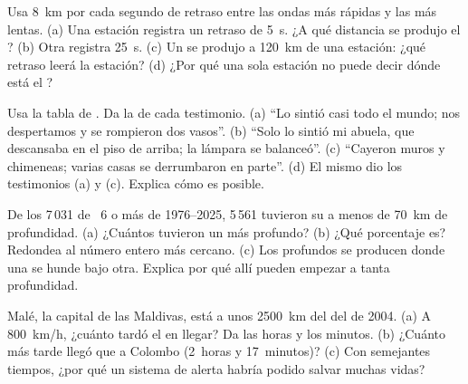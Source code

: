 \begin{exercise}[$\star\star$]\label{exo:g7:earthquakes:7}
Usa \qty{8}{km} por cada segundo de retraso entre las ondas más rápidas y
las más lentas. (a) Una estación registra un retraso de \qty{5}{s}. ¿A qué
distancia se produjo el ? (b) Otra registra \qty{25}{s}. (c) Un
 se produjo a \qty{120}{km} de una estación: ¿qué retraso leerá
la estación? (d) ¿Por qué una sola estación no puede decir dónde está el
?
\end{exercise}

\begin{exercise}[$\star\star$]\label{exo:g7:earthquakes:8}
Usa la tabla de . Da la  de cada testimonio.
(a) ``Lo sintió casi todo el mundo; nos despertamos y se rompieron dos
vasos''. (b) ``Solo lo sintió mi abuela, que descansaba en el piso de
arriba; la lámpara se balanceó''. (c) ``Cayeron muros y chimeneas; varias
casas se derrumbaron en parte''. (d) El mismo  dio los testimonios
(a) y (c). Explica cómo es posible.
\end{exercise}

\begin{exercise}[$\star\star$]\label{exo:g7:earthquakes:9}
De los 7\,031  de ~6 o más de 1976--2025, 5\,561 tuvieron
su  a menos de \qty{70}{km} de profundidad. (a) ¿Cuántos tuvieron
un  más profundo? (b) ¿Qué porcentaje es? Redondea al número
entero más cercano. (c) Los profundos se producen donde una  se hunde
bajo otra. Explica por qué allí pueden empezar a tanta profundidad.
\end{exercise}

\begin{exercise}[$\star\star$]\label{exo:g7:earthquakes:10}
Malé, la capital de las Maldivas, está a unos \qty{2500}{km} del
 del  de 2004. (a) A \qty{800}{km/h}, ¿cuánto tardó el
 en llegar? Da las horas y los minutos. (b) ¿Cuánto más tarde llegó
que a Colombo (2~horas y 17~minutos)? (c) Con semejantes tiempos, ¿por qué
un sistema de alerta habría podido salvar muchas vidas?
\end{exercise}


